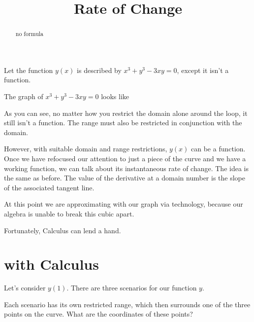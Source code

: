 \documentclass{ximera}
\title{Rate of Change}
\begin{document}
\begin{abstract}
no formula
\end{abstract}
\maketitle




Let the function $y(x)$ is described by $x^3 + y^3 - 3 x y = 0$, except it isn't a function.



The graph of $x^3 + y^3 - 3 x y = 0$ looks like




\begin{center}
\end{center}


As you can see, no matter how you restrict the domain alone around the loop, it still isn't a function. The range must also be restricted in conjunction with the domain.

However, with suitable domain and range restrictions, $y(x)$ can be a function. \\


Once we have refocused our attention to just a piece of the curve and we have a working function, we can talk about its instantaneous rate of change.  The idea is the same as before.  The value of the derivative at a domain number is the slope of the associated tangent line.


At this point we are approximating with our graph via technology, because our algebra is unable to break this cubic apart.



Fortunately, Calculus can lend a hand.




\section{with Calculus}

Let's consider $y(1)$.  There are three scenarios for our function $y$.


\begin{center}
\end{center}

Each scenario has its own restricted range, which then surrounds one of the three points on the curve. What are the coordinates of these points?
\end{document}
